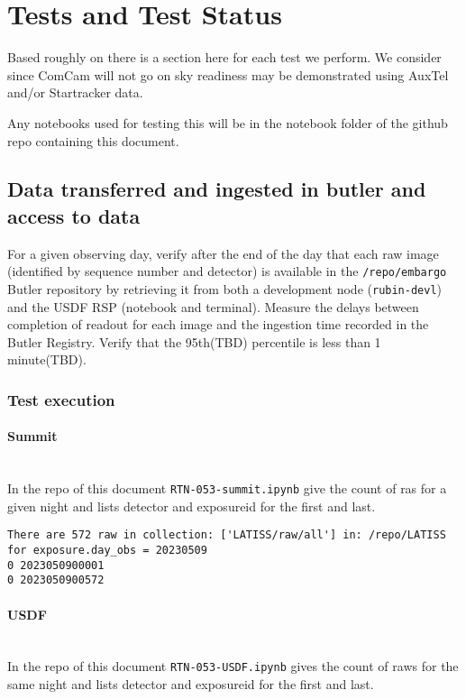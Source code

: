 \section{Tests and Test Status} \label{sec:testing}
Based roughly on  there is a section here for each test we perform.
We consider since ComCam will not go on sky readiness may be demonstrated using AuxTel and/or Startracker data.

Any notebooks used for testing this will be in the notebook folder of the github repo containing this document.

\subsection{Data transferred and ingested in butler and access to data}
For a given observing day, verify after the end of the day that each raw image (identified by sequence number and detector) is available in the \texttt{/repo/embargo} Butler repository by retrieving it from both a development node (\texttt{rubin-devl}) and the USDF RSP (notebook and terminal).
Measure the delays between completion of readout for each image and the ingestion time recorded in the Butler Registry.
Verify that the 95th(TBD) percentile is less than 1 minute(TBD).

\subsubsection{Test execution}
\paragraph{Summit}\\
In the repo of this document \texttt{RTN-053-summit.ipynb} give the count of ras for a given night and lists detector and exposureid for the first and last.
\begin{verbatim}
There are 572 raw in collection: ['LATISS/raw/all'] in: /repo/LATISS for exposure.day_obs = 20230509
0 2023050900001
0 2023050900572
\end{verbatim}

\paragraph{USDF}\\
In the repo of this document \texttt{RTN-053-USDF.ipynb} gives the count of raws for the same night and lists detector and exposureid for the first and last.

